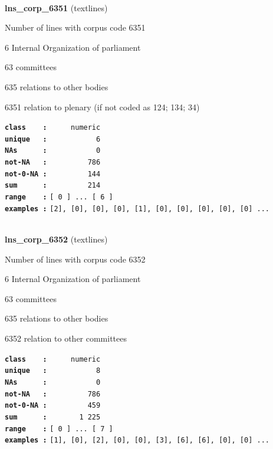 \documentclass[]{article}
\begin{document}
~

\textbf{lns\_corp\_6351} (textlines)

Number of lines with corpus code 6351

6 Internal Organization of parliament

63 committees

635 relations to other bodies

6351 relation to plenary (if not coded as 124; 134; 34)

\textbf{\texttt{class\ \ \ \ :}} \texttt{~~~~~numeric}\\
\textbf{\texttt{unique\ \ \ :}} \texttt{~~~~~~~~~~~6}\\
\textbf{\texttt{NAs\ \ \ \ \ \ :}} \texttt{~~~~~~~~~~~0}\\
\textbf{\texttt{not-NA\ \ \ :}} \texttt{~~~~~~~~~786}\\
\textbf{\texttt{not-0-NA\ :}} \texttt{~~~~~~~~~144}\\
\textbf{\texttt{sum\ \ \ \ \ \ :}} \texttt{~~~~~~~~~214}\\
\textbf{\texttt{range\ \ \ \ :}}
\texttt{{[}\ 0\ {]}\ ...\ {[}\ 6\ {]}}\\
\textbf{\texttt{examples\ :}}
\texttt{{[}2{]},\ {[}0{]},\ {[}0{]},\ {[}0{]},\ {[}1{]},\ {[}0{]},\ {[}0{]},\ {[}0{]},\ {[}0{]},\ {[}0{]}\ ...}\\

~

\textbf{lns\_corp\_6352} (textlines)

Number of lines with corpus code 6352

6 Internal Organization of parliament

63 committees

635 relations to other bodies

6352 relation to other committees

\textbf{\texttt{class\ \ \ \ :}} \texttt{~~~~~numeric}\\
\textbf{\texttt{unique\ \ \ :}} \texttt{~~~~~~~~~~~8}\\
\textbf{\texttt{NAs\ \ \ \ \ \ :}} \texttt{~~~~~~~~~~~0}\\
\textbf{\texttt{not-NA\ \ \ :}} \texttt{~~~~~~~~~786}\\
\textbf{\texttt{not-0-NA\ :}} \texttt{~~~~~~~~~459}\\
\textbf{\texttt{sum\ \ \ \ \ \ :}} \texttt{~~~~~~~1~225}\\
\textbf{\texttt{range\ \ \ \ :}}
\texttt{{[}\ 0\ {]}\ ...\ {[}\ 7\ {]}}\\
\textbf{\texttt{examples\ :}}
\texttt{{[}1{]},\ {[}0{]},\ {[}2{]},\ {[}0{]},\ {[}0{]},\ {[}3{]},\ {[}6{]},\ {[}6{]},\ {[}0{]},\ {[}0{]}\ ...}\\
\end{document}
